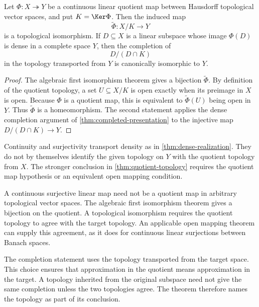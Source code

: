 \begin{theorem}
\label{thm:quotient-topology}
Let $\Phi:X\twoheadrightarrow Y$ be a continuous linear quotient map between Hausdorff topological vector spaces, and put $K=\Ker\Phi$.  Then the induced map
\[
\widetilde\Phi:X/K\longrightarrow Y
\]
is a topological isomorphism.  If $D\subseteq X$ is a linear subspace whose image $\Phi(D)$ is dense in a complete space $Y$, then the completion of
\[
D/(D\cap K)
\]
in the topology transported from $Y$ is canonically isomorphic to $Y$.
\end{theorem}

\begin{proof}
The algebraic first isomorphism theorem gives a bijection $\widetilde\Phi$.  By definition of the quotient topology, a set $U\subseteq X/K$ is open exactly when its preimage in $X$ is open.  Because $\Phi$ is a quotient map, this is equivalent to $\widetilde\Phi(U)$ being open in $Y$.  Thus $\widetilde\Phi$ is a homeomorphism.  The second statement applies the dense completion argument of \cref{thm:completed-presentation} to the injective map $D/(D\cap K)\to Y$.
\end{proof}

\begin{boundary}
\label{bnd:topological-quotient}
Continuity and surjectivity transport density as in \cref{thm:dense-realization}.  They do not by themselves identify the given topology on $Y$ with the quotient topology from $X$.  The stronger conclusion in \cref{thm:quotient-topology} requires the quotient map hypothesis or an equivalent open mapping condition.
\end{boundary}

\begin{warningbox}
A continuous surjective linear map need not be a quotient map in arbitrary topological vector spaces.  The algebraic first isomorphism theorem gives a bijection on the quotient.  A topological isomorphism requires the quotient topology to agree with the target topology.  An applicable open mapping theorem can supply this agreement, as it does for continuous linear surjections between Banach spaces.
\end{warningbox}

The completion statement uses the topology transported from the target space.  This choice ensures that approximation in the quotient means approximation in the target.  A topology inherited from the original subspace need not give the same completion unless the two topologies agree.  The theorem therefore names the topology as part of its conclusion.

